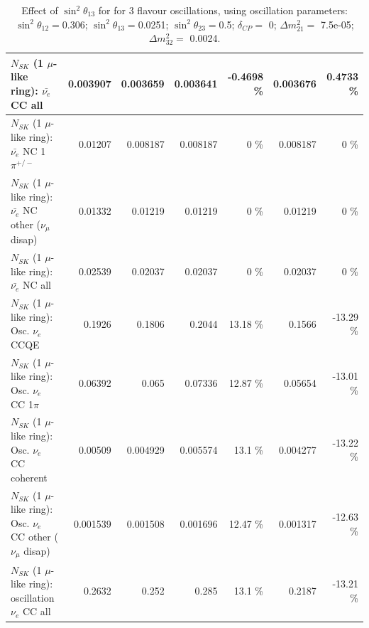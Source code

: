 \begin{table}
\begin{tabular}{| l | r | r | r  r | r  r |}
                            $N_{SK}$ (1 $\mu$-like ring): $\bar{\nu_{e}}$ CC all &        0.003907 &        0.003659 &        0.003641 &  -0.4698 \%  &        0.003676 &   0.4733 \%  \\ 
\hline
                     $N_{SK}$ (1 $\mu$-like ring): $\bar{\nu_e}$ NC 1$\pi^{+/-}$ &         0.01207 &        0.008187 &        0.008187 &        0 \%  &        0.008187 &        0 \%  \\ 
          $N_{SK}$ (1 $\mu$-like ring): $\bar{\nu_e}$ NC other ($\nu_\mu$ disap) &         0.01332 &         0.01219 &         0.01219 &        0 \%  &         0.01219 &        0 \%  \\ 
                            $N_{SK}$ (1 $\mu$-like ring): $\bar{\nu_{e}}$ NC all &         0.02539 &         0.02037 &         0.02037 &        0 \%  &         0.02037 &        0 \%  \\ 
\hline
\hline
\hline
                                 $N_{SK}$ (1 $\mu$-like ring): Osc. $\nu_e$ CCQE &          0.1926 &          0.1806 &          0.2044 &    13.18 \%  &          0.1566 &   -13.29 \%  \\ 
                            $N_{SK}$ (1 $\mu$-like ring): Osc. $\nu_e$ CC 1$\pi$ &         0.06392 &           0.065 &         0.07336 &    12.87 \%  &         0.05654 &   -13.01 \%  \\ 
                          $N_{SK}$ (1 $\mu$-like ring): Osc. $\nu_e$ CC coherent &         0.00509 &        0.004929 &        0.005574 &     13.1 \%  &        0.004277 &   -13.22 \%  \\ 
           $N_{SK}$ (1 $\mu$-like ring): Osc. $\nu_e$ CC other ($\nu_\mu$ disap) &        0.001539 &        0.001508 &        0.001696 &    12.47 \%  &        0.001317 &   -12.63 \%  \\ 
                        $N_{SK}$ (1 $\mu$-like ring): oscillation $\nu_e$ CC all &          0.2632 &           0.252 &           0.285 &     13.1 \%  &          0.2187 &   -13.21 \%  \\ 
\hline
\hline
\end{tabular}
\caption{ Effect of $\sin^2\theta_{13}$ for for 3 flavour oscillations, using oscillation parameters:  $\sin^2\theta_{12} = $0.306; $\sin^2\theta_{13} = $0.0251; $\sin^2\theta_{23} = $0.5; $\delta_{CP} = $        0; $\Delta m^2_{21} = $    7.5e-05; $\Delta m^2_{32} = $    0.0024. }
\label{tab:num_mixing13_1RmuT_3f_osc_t13:0.0251}
\end{table}
\clearpage
